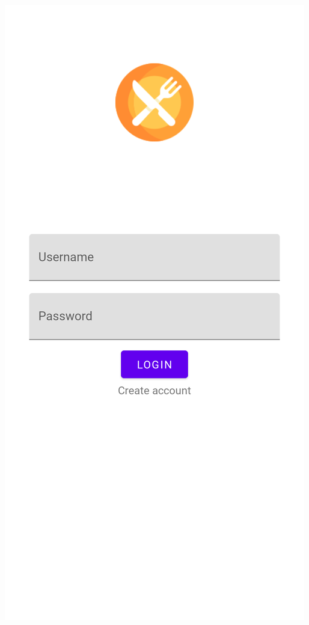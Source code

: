 \documentclass{article}
\begin{document}
\begin{center}
\includegraphics[scale=0.15]{login}
\end{center}
\end{document}
